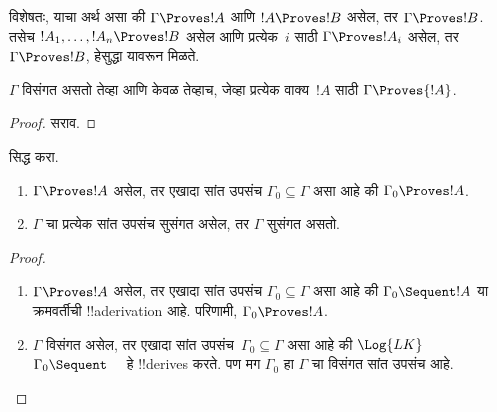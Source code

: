 \documentclass[../../../include/open-logic-section]{subfiles}
\begin{document}
विशेषतः, याचा अर्थ असा की $\Gamma \Proves !A$ आणि $!A
\Proves !B$ असेल, तर $\Gamma \Proves !B$. तसेच $!A_1,
\dots, !A_n \Proves !B$ असेल आणि प्रत्येक~$i$ साठी $\Gamma \Proves !A_i$
असेल, तर $\Gamma \Proves !B$, हेसुद्धा यावरून मिळते.

\begin{prop}
$\Gamma$ विसंगत असतो तेव्हा आणि केवळ तेव्हाच, जेव्हा प्रत्येक
  वाक्य~$!A$ साठी $\Gamma \Proves {!A}$.
\end{prop}

\begin{proof}
सराव.
\end{proof}

\begin{prob}
 सिद्ध करा.
\end{prob}

\begin{prop}[संहतता]
  \begin{enumerate}
  \item $\Gamma \Proves !A$ असेल, तर एखादा सांत उपसंच $\Gamma_0
    \subseteq \Gamma$ असा आहे की $\Gamma_0 \Proves !A$.
  \item $\Gamma$ चा प्रत्येक सांत उपसंच सुसंगत असेल, तर $\Gamma$ सुसंगत
    असतो.
  \end{enumerate}
\end{prop}

\begin{proof}
  \begin{enumerate}
    \item $\Gamma \Proves !A$ असेल, तर एखादा सांत उपसंच
      $\Gamma_0 \subseteq \Gamma$ असा आहे की $\Gamma_0
      \Sequent !A$ या क्रमवर्तीची !!a{derivation} आहे. परिणामी,
      $\Gamma_0 \Proves !A$.
    \item $\Gamma$ विसंगत असेल, तर एखादा सांत
      उपसंच~$\Gamma_0 \subseteq \Gamma$ असा आहे की $\Log{LK}$
      $\Gamma_0 \Sequent \quad$ हे !!{derive}s करते. पण मग $\Gamma_0$ हा
      $\Gamma$ चा विसंगत सांत उपसंच आहे.
  \end{enumerate}
\end{proof}
\end{document}
